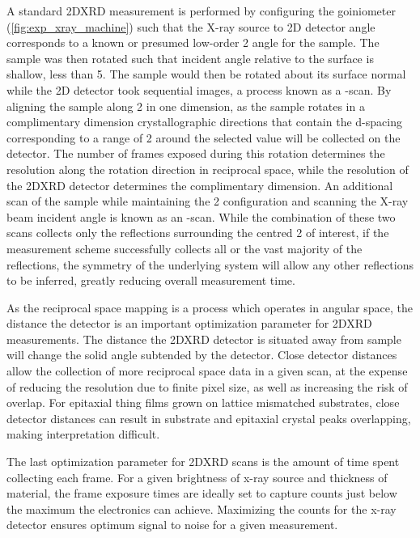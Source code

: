 A standard 2DXRD measurement is performed by configuring the goiniometer (\cref{fig:exp_xray_machine}) such that the X-ray source to 2D detector angle corresponds to a known or presumed low-order 2\texttheta{} angle for the sample. The sample was then rotated such that incident angle relative to the surface is shallow, less than 5\degree{}. The sample would then be rotated about its surface normal while the 2D detector took sequential images, a process known as a \textphi{}-scan. By aligning the sample along 2\texttheta{} in one dimension, as the sample rotates in a complimentary dimension crystallographic directions that contain the d-spacing corresponding to a range of 2\texttheta{} around the selected value will be collected on the detector. The number of frames exposed during this rotation determines the resolution along the rotation direction in reciprocal space, while the resolution of the 2DXRD detector determines the complimentary dimension. An additional scan of the sample while maintaining the 2\texttheta{} configuration and scanning the X-ray beam incident angle is known as an \textomega{}-scan. While the combination of these two scans collects only the reflections surrounding the centred 2\texttheta{} of interest, if the measurement scheme successfully collects all or the vast majority of the reflections, the symmetry of the underlying system will allow any other reflections to be inferred, greatly reducing overall measurement time.

As the reciprocal space mapping is a process which operates in angular space, the distance the detector is an important optimization parameter for 2DXRD measurements. The distance the 2DXRD detector is situated away from sample will change the solid angle subtended by the detector. Close detector distances allow the collection of more reciprocal space data in a given scan, at the expense of reducing the resolution due to finite pixel size, as well as increasing the risk of overlap. For epitaxial thing films grown on lattice mismatched substrates, close detector distances can result in substrate and epitaxial crystal peaks overlapping, making interpretation difficult.

The last optimization parameter for 2DXRD scans is the amount of time spent collecting each frame. For a given brightness of x-ray source and thickness of material, the frame exposure times are ideally set to capture counts just below the maximum the electronics can achieve. Maximizing the counts for the x-ray detector ensures optimum signal to noise for a given measurement.

